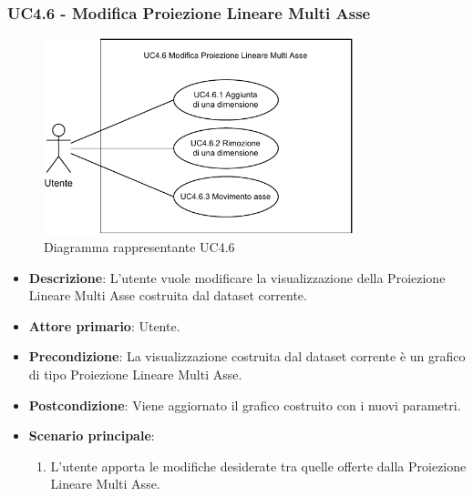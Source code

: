 \newpage
\subsubsection{UC4.6 - Modifica Proiezione Lineare Multi Asse}
\label{ssub:uc4.6}
\begin{figure}[h]
    \centering
    \includegraphics[width=0.8\textwidth]{componenti/casi-duso/diagrammi/UC4_6.pdf}
    \caption{Diagramma rappresentante UC4.6}
    \label{fig:UC4.6}
\end{figure}

\begin{itemize}
    \item \textbf{Descrizione}: L’utente vuole modificare la visualizzazione della Proiezione Lineare Multi Asse
                                costruita dal dataset corrente.

    \item \textbf{Attore primario}: Utente.

    \item \textbf{Precondizione}:   La visualizzazione costruita dal dataset corrente è un grafico di tipo Proiezione Lineare Multi Asse.
    \item \textbf{Postcondizione}:  Viene aggiornato il grafico costruito con i nuovi parametri.

	\item \textbf{Scenario principale}:
		\begin{enumerate}
            \item L'utente apporta le modifiche desiderate tra quelle offerte dalla Proiezione Lineare Multi Asse.
        \end{enumerate}
\end{itemize}

